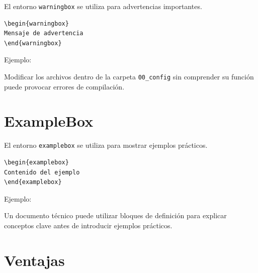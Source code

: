 El entorno \texttt{warningbox} se utiliza para
advertencias importantes.

\begin{lstlisting}[caption={Uso de warningbox},label={code:warningbox}]
\begin{warningbox}
Mensaje de advertencia
\end{warningbox}
\end{lstlisting}




Ejemplo:

\begin{warningbox}
Modificar los archivos dentro de la carpeta
\texttt{00\_config} sin comprender su función
puede provocar errores de compilación.
\end{warningbox}




\section{ExampleBox}

El entorno \texttt{examplebox} se utiliza para
mostrar ejemplos prácticos.

\begin{lstlisting}[caption={Uso de examplebox},label={code:examplebox}]
\begin{examplebox}
Contenido del ejemplo
\end{examplebox}
\end{lstlisting}




Ejemplo:

\begin{examplebox}
Un documento técnico puede utilizar bloques de
definición para explicar conceptos clave antes
de introducir ejemplos prácticos.
\end{examplebox}




\section{Ventajas}

